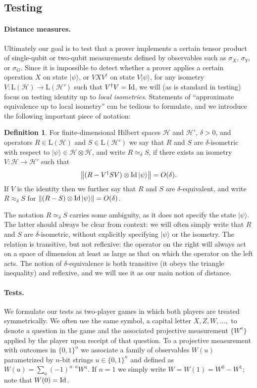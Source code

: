 \documentclass[11pt]{article}
\theoremstyle{remark}
\theoremstyle{definition}
\newtheorem{definition}[theorem]{Definition}
\newcommand{\ket}[1]{|#1\rangle}
\newcommand{\Id}{\ensuremath{\mathop{\rm Id}\nolimits}}
\newcommand{\mH}{\mathcal{H}}
\newcommand{\setft}[1]{\mathrm{#1}}
\newcommand{\Lin}{\setft{L}}
\begin{document}
\subsection{Testing}
\label{sec:general-rigidity}

\paragraph{Distance measures.}
Ultimately our goal is to test that a prover implements a certain tensor product of single-qubit or two-qubit measurements defined by observables such as $\sigma_X$, $\sigma_Y$, or $\sigma_G$. Since it is impossible to detect whether a prover applies a certain operation $X$ on state $\ket{\psi}$, or $VXV^\dagger$ on state $V\ket{\psi}$, for any isometry $V:\Lin(\mH)\to\Lin(\mH')$ such that $V^\dagger V = \Id$, we will (as is standard in testing) focus on testing identity up to \emph{local isometries}. Statements of ``approximate equivalence up to local isometry'' can be tedious to formulate, and we introduce the following important piece of notation: 

\begin{definition}
For finite-dimensional Hilbert spaces $\mH$ and $\mH'$, $\delta>0$, and operators $R \in\Lin(\mH)$ and $S\in\Lin(\mH')$ we say that $R$ and $S$ are $\delta$-isometric with respect to $\ket{\psi} \in \mH \otimes \mH$, and write $R\simeq_\delta S$, if there exists an isometry $V:\mH\to\mH'$ such that 
$$\big\|( R-V^\dagger SV)\otimes \Id \ket{\psi}\big\|=O(\delta).$$
If $V$ is the identity then we further say that $R$ and $S$ are $\delta$-equivalent, and write $R\approx_\delta S$ for $\| ( R- S) \otimes \Id \ket{\psi}\|=O(\delta)$.
\end{definition}

The notation $R\simeq_\delta S$ carries some ambiguity, as it does not specify the state $\ket{\psi}$. The latter should always be clear from context: we will often simply write that $R$ and $S$ are $\delta$-isometric, without explicitly specifying $\ket{\psi}$ or the isometry. The relation is transitive, but not reflexive: the operator on the right will always act on a space of dimension at least as large as that on which the operator on the left acts. The notion of $\delta$-equivalence is both transitive (it obeys the triangle inequality) and reflexive, and we will use it as our main notion of distance. 

\paragraph{Tests.}
We formulate our tests as two-player games in which both players are treated symmetrically.  We often use the same symbol, a capital letter $X,Z,W,\ldots,$ to denote a question in the game and the associated projective measurement $\{W^a\}$ applied by the player upon receipt of that question. To a projective measurement with outcomes in $\{0,1\}^n$ we  associate a family of observables $W(u)$ parametrized by $n$-bit strings $u\in\{0,1\}^n$ and defined as $W(u) = \sum_a (-1)^{u\cdot a} W^a$. If $n=1$ we simply write $W=W(1)=W^0-W^1$; note that $W(0)=\Id$.
\end{document}
